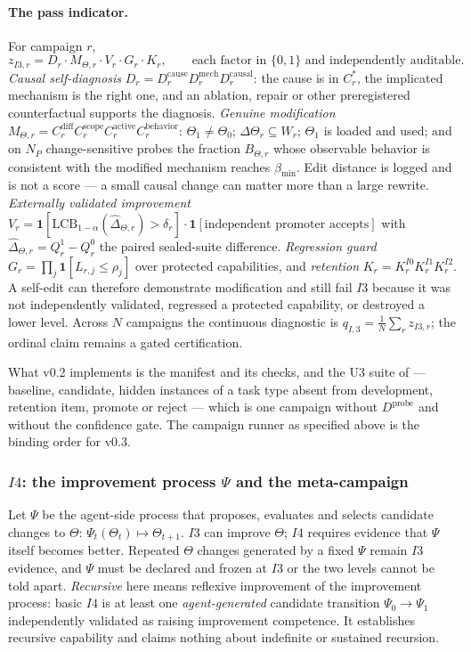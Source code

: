 \paragraph{The pass indicator.} For campaign $r$,
\[
z_{I3,r} = D_r \cdot M_{\Theta,r} \cdot V_r \cdot G_r \cdot K_r, \qquad \text{each factor in } \{0,1\} \text{ and independently auditable.}
\]
\emph{Causal self-diagnosis} $D_r = D^{\mathrm{cause}}_r D^{\mathrm{mech}}_r D^{\mathrm{causal}}_r$: the cause is in $C^{*}_r$, the implicated mechanism is the right one, and an ablation, repair or other preregistered counterfactual supports the diagnosis. \emph{Genuine modification} $M_{\Theta,r} = C^{\mathrm{diff}}_r C^{\mathrm{scope}}_r C^{\mathrm{active}}_r C^{\mathrm{behavior}}_r$: $\Theta_1 \ne \Theta_0$; $\Delta\Theta_r \subseteq W_r$; $\Theta_1$ is loaded and used; and on $N_P$ change-sensitive probes the fraction $B_{\Theta,r}$ whose observable behavior is consistent with the modified mechanism reaches $\beta_{\min}$. Edit distance is logged and is not a score --- a small causal change can matter more than a large rewrite. \emph{Externally validated improvement} $V_r = \mathbf 1[\mathrm{LCB}_{1-\alpha}(\hat\Delta_{\Theta,r}) > \delta_r] \cdot \mathbf 1[\text{independent promoter accepts}]$ with $\hat\Delta_{\Theta,r} = Q^{1}_r - Q^{0}_r$ the paired sealed-suite difference. \emph{Regression guard} $G_r = \prod_j \mathbf 1[L_{r,j} \le \rho_j]$ over protected capabilities, and \emph{retention} $K_r = K^{I0}_r K^{I1}_r K^{I2}_r$. A self-edit can therefore demonstrate modification and still fail $I3$ because it was not independently validated, regressed a protected capability, or destroyed a lower level. Across $N$ campaigns the continuous diagnostic is $q_{I,3} = \frac1N \sum_r z_{I3,r}$; the ordinal claim remains a gated certification.

What v0.2 implements is the manifest and its checks, and the U3 suite of \citet{yang2026uab} --- baseline, candidate, hidden instances of a task type absent from development, retention item, promote or reject --- which is one campaign without $D^{\mathrm{probe}}$ and without the confidence gate. The campaign runner as specified above is the binding order for v0.3.

\subsubsection{$I4$: the improvement process $\Psi$ and the meta-campaign}\label{sec:i4}

Let $\Psi$ be the agent-side process that proposes, evaluates and selects candidate changes to $\Theta$: $\Psi_t(\Theta_t) \mapsto \Theta_{t+1}$. $I3$ can improve $\Theta$; $I4$ requires evidence that $\Psi$ itself becomes better. Repeated $\Theta$ changes generated by a fixed $\Psi$ remain $I3$ evidence, and $\Psi$ must be declared and frozen at $I3$ or the two levels cannot be told apart. \emph{Recursive} here means reflexive improvement of the improvement process: basic $I4$ is at least one \emph{agent-generated} candidate transition $\Psi_0 \to \Psi_1$ independently validated as raising improvement competence. It establishes recursive capability and claims nothing about indefinite or sustained recursion.

